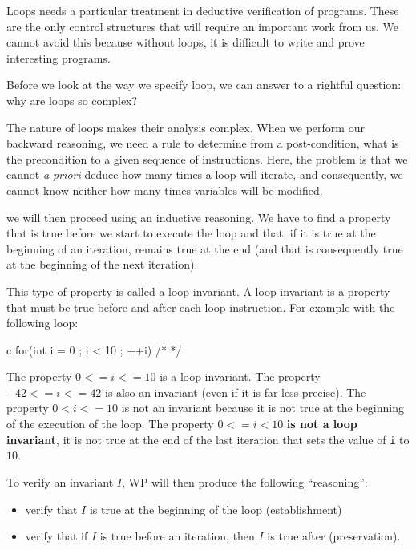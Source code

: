 Loops needs a particular treatment in deductive verification of
programs. These are the only control structures that will require an
important work from us. We cannot avoid this because without loops, it
is difficult to write and prove interesting programs.



Before we look at the way we specify loop, we can answer to a rightful
question: why are loops so complex?





The nature of loops makes their analysis complex. When we perform our
backward reasoning, we need a rule to determine from a post-condition,
what is the precondition to a given sequence of instructions. Here, the
problem is that we cannot \emph{a priori} deduce how many times a loop
will iterate, and consequently, we cannot know neither how many times
variables will be modified.



we will then proceed using an inductive reasoning. We have to find a
property that is true before we start to execute the loop and that, if
it is true at the beginning of an iteration, remains true at the end
(and that is consequently true at the beginning of the next iteration).



This type of property is called a loop invariant. A loop invariant is a
property that must be true before and after each loop instruction. For
example with the following loop:



\begin{CodeBlock}{c}
for(int i = 0 ; i < 10 ; ++i){ /* */ }
\end{CodeBlock}



The property $0 <= i <= 10$ is a loop invariant. The property
$-42 <= i <= 42$ is also an invariant (even if it is far less
precise). The property $0 < i <= 10$ is not an invariant because it is
not true at the beginning of the execution of the loop. The property
$0 <= i < 10$ \textbf{is not a loop invariant}, it is not true at the
end of the last iteration that sets the value of \texttt{i} to $10$.

To verify an invariant $I$, WP will then produce the following
``reasoning'':

\begin{itemize}
\item
  verify that $I$ is true at the beginning of the loop (establishment)
\item
  verify that if $I$ is true before an iteration, then $I$ is true
  after (preservation).
\end{itemize}

